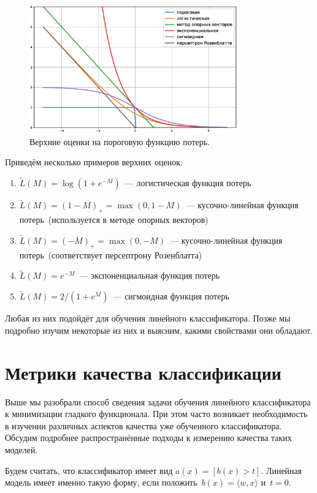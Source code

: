\documentclass[12pt,fleqn]{article}
\begin{document}
\begin{figure}[t]
    \centering
    \includegraphics[width=0.8\textwidth]{threshold-approx.eps}
    \caption{Верхние оценки на пороговую функцию потерь.}
    \label{fig:bounds}
\end{figure}

Приведём несколько примеров верхних оценок:
\begin{enumerate}
    \item $\tilde L(M) = \log \left(1 + e^{-M} \right)$~--- логистическая функция потерь
    \item $\tilde L(M) = (1 - M)_+ = \max(0, 1 - M)$~--- кусочно-линейная функция потерь~(используется в методе опорных векторов)
    \item $\tilde L(M) = (-M)_+ = \max(0, -M)$~--- кусочно-линейная функция потерь~(соответствует персептрону Розенблатта)
    \item $\tilde L(M) = e^{-M}$~--- экспоненциальная функция потерь
    \item $\tilde L(M) = 2/(1 + e^M)$~--- сигмоидная функция потерь
\end{enumerate}
Любая из них подойдёт для обучения линейного классификатора.
Позже мы подробно изучим некоторые из них и выясним, какими свойствами они обладают.

\section{Метрики качества классификации}
Выше мы разобрали способ сведения задачи обучения линейного классификатора
к минимизации гладкого функционала.
При этом часто возникает необходимость в изучении различных аспектов качества
уже обученного классификатора.
Обсудим подробнее распространённые подходы к измерению качества таких моделей.

Будем считать, что классификатор имеет вид $a(x) = [b(x) > t]$.
Линейная модель имеет именно такую форму, если положить~$b(x) = \langle w, x \rangle$ и~$t = 0$.
\end{document}
